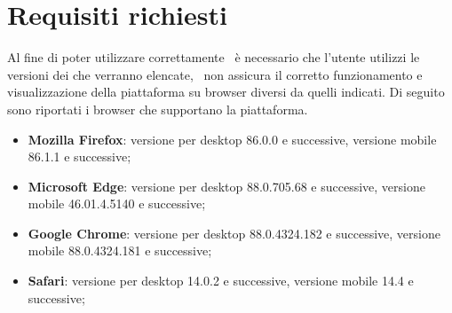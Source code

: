 \section{Requisiti richiesti}\label{Requisiti}
Al fine di poter utilizzare correttamente \NomeProgetto\ è necessario che l'utente utilizzi le versioni dei  che verranno elencate, \Gruppo\ non assicura il corretto funzionamento e visualizzazione della piattaforma su browser diversi da quelli indicati.
Di seguito sono riportati i browser che supportano la piattaforma.
\begin{itemize}
	\item \textbf{Mozilla Firefox}: versione per desktop 86.0.0 e successive, versione mobile 86.1.1 e successive; 
	\item \textbf{Microsoft Edge}: versione per desktop 88.0.705.68 e successive, versione mobile 46.01.4.5140 e successive;
	\item \textbf{Google Chrome}: versione per desktop 88.0.4324.182 e successive, versione mobile 88.0.4324.181 e successive;
	\item \textbf{Safari}: versione per desktop 14.0.2 e successive, versione mobile 14.4 e successive; 
\end{itemize}